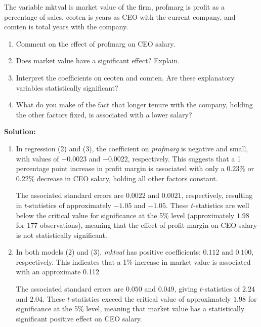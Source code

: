 \documentclass[12pt]{article}
\begin{document}
\begin{enumerate}
The variable mktval is market value of the firm, profmarg is profit as a percentage of sales, ceoten is years as CEO with the current company, and comten is total years with the company.
\begin{enumerate}
\item Comment on the effect of profmarg on CEO salary.
\item Does market value have a significant effect? Explain.
\item Interpret the coefficients on ceoten and comten. Are these explanatory variables statistically significant?
\item What do you make of the fact that longer tenure with the company, holding the other factors fixed, is associated with a lower salary?
\end{enumerate}

{\color{blue}
\noindent \textbf{Solution:}

\begin{enumerate}
    \item In regression (2) and (3), the coefficient on \textit{profmarg} is negative and small, with values of $-0.0023$ and $-0.0022$, respectively. This suggests that a 1 percentage point increase in profit margin is associated with only a 0.23\% or 0.22\% decrease in CEO salary, holding all other factors constant.

The associated standard errors are $0.0022$ and $0.0021$, respectively, resulting in $t$-statistics of approximately $-1.05$ and $-1.05$. These $t$-statistics are well below the critical value for significance at the 5\% level (approximately $1.98$ for 177 observations), meaning that the effect of profit margin on CEO salary is not statistically significant.

\item In both models (2) and (3), \textit{mktval} has positive coefficients: $0.112$ and $0.100$, respectively. This indicates that a 1\% increase in market value is associated with an approximate 0.112%

The associated standard errors are $0.050$ and $0.049$, giving $t$-statistics of $2.24$ and $2.04$. These $t$-statistics exceed the critical value of approximately $1.98$ for significance at the 5\% level, meaning that market value has a statistically significant positive effect on CEO salary.


\end{enumerate}}
\end{enumerate}
\end{document}
